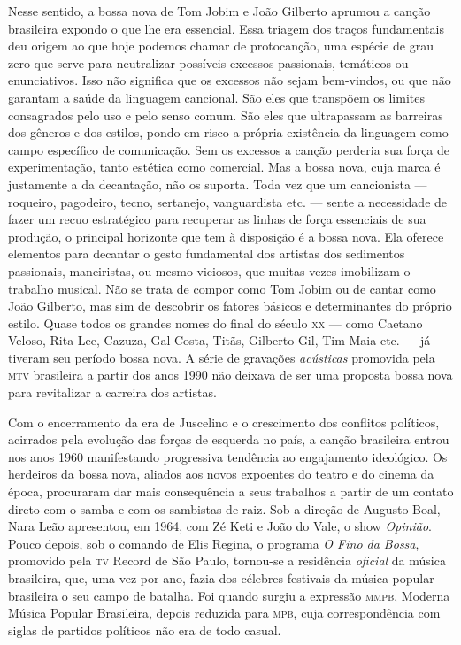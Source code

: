 Nesse sentido, a bossa nova de Tom Jobim e João Gilberto aprumou a
canção brasileira expondo o que lhe era essencial. Essa triagem dos
traços fundamentais deu origem ao que hoje podemos chamar de
protocanção, uma espécie de grau zero que serve para neutralizar
possíveis excessos passionais, temáticos ou enunciativos. Isso não
significa que os excessos não sejam bem-vindos, ou que não garantam a
saúde da linguagem cancional. São eles que transpõem os limites
consagrados pelo uso e pelo senso comum. São eles que ultrapassam as
barreiras dos gêneros e dos estilos, pondo em risco a própria existência
da linguagem como campo específico de comunicação. Sem os excessos a
canção perderia sua força de experimentação, tanto estética como
comercial. Mas a bossa nova, cuja marca é justamente a da decantação,
não os suporta. Toda vez que um cancionista --- roqueiro, pagodeiro,
tecno, sertanejo, vanguardista etc. --- sente a necessidade de fazer um
recuo estratégico para recuperar as linhas de força essenciais de sua
produção, o principal horizonte que tem à disposição é a bossa nova. Ela
oferece elementos para decantar o gesto fundamental dos artistas dos
sedimentos passionais, maneiristas, ou mesmo viciosos, que muitas vezes
imobilizam o trabalho musical. Não se trata de compor como Tom Jobim ou
de cantar como João Gilberto, mas sim de descobrir os fatores básicos e
determinantes do próprio estilo. Quase todos os grandes nomes do final
do século \textsc{xx} --- como Caetano Veloso, Rita Lee, Cazuza, Gal Costa,
Titãs, Gilberto Gil, Tim Maia etc. --- já tiveram seu período
bossa nova. A série de gravações \textit{acústicas} promovida pela \textsc{mtv}
brasileira a partir dos anos 1990 não deixava de ser uma proposta
bossa nova para revitalizar a carreira dos artistas.

Com o encerramento da era de Juscelino e o crescimento dos conflitos
políticos, acirrados pela evolução das forças de esquerda no país, a
canção brasileira entrou nos anos 1960 manifestando progressiva
tendência ao engajamento ideológico. Os herdeiros da bossa nova, aliados
aos novos expoentes do teatro e do cinema da época, procuraram dar mais
consequência a seus trabalhos a partir de um contato direto com o samba
e com os sambistas de raiz. Sob a direção de Augusto Boal, Nara Leão
apresentou, em 1964, com Zé Keti e João do Vale, o show \textit{Opinião}. Pouco
depois, sob o comando de Elis Regina, o programa \textit{O Fino da Bossa},
promovido pela \textsc{tv} Record de São Paulo, tornou-se a residência
\textit{oficial} da música brasileira, que, uma vez por ano, fazia dos
célebres festivais da música popular brasileira o seu campo de batalha.
Foi quando surgiu a expressão \textsc{mmpb}, Moderna Música Popular Brasileira,
depois reduzida para \textsc{mpb}, cuja correspondência com siglas de partidos
políticos não era de todo casual.

